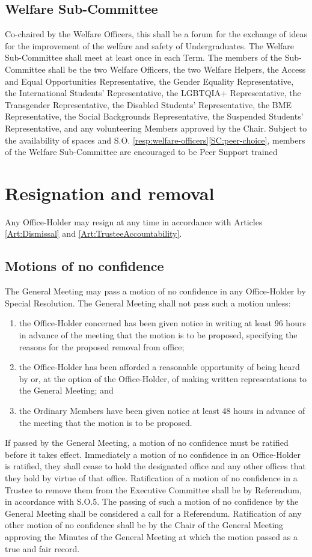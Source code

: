 \subsection{Welfare Sub-Committee} \label{ssec:welfare-committee}
\npara Co-chaired by the Welfare Officers, this shall be a forum for the exchange of ideas for the improvement of the welfare and safety of Undergraduates.
\npara The Welfare Sub-Committee shall meet at least once in each Term.
\npara The members of the Sub-Committee shall be the two Welfare Officers, the two Welfare Helpers, the Access and Equal Opportunities Representative, the Gender Equality Representative, the International Students’ Representative, the LGBTQIA+ Representative, the Transgender Representative, the Disabled Students’ Representative, the BME Representative, the Social Backgrounds Representative, the Suspended Students' Representative, and any volunteering Members approved by the Chair.
\npara Subject to the availability of spaces and S.O. \ref{resp:welfare-officers}\ref{SC:peer-choice}, members of the Welfare Sub-Committee are encouraged to be Peer Support trained
\section{Resignation and removal}
\npara Any Office-Holder may resign at any time in accordance with Articles \ref{Art:Dismissal} and \ref{Art:TrusteeAccountability}.
\subsection{Motions of no confidence}
\npara The General Meeting may pass a motion of no confidence in any Office-Holder by Special Resolution.  The General Meeting shall not pass such a motion unless:
\begin{enumerate}
	\item the Office-Holder concerned has been given notice in writing at least 96 hours in advance of the meeting that the motion is to be proposed, specifying the reasons for the proposed removal from office;
	\item the Office-Holder has been afforded a reasonable opportunity of being heard by or, at the option of the Office-Holder, of making written representations to the General Meeting; and
	\item the Ordinary Members have been given notice at least 48 hours in advance of the meeting that the motion is to be proposed.
\end{enumerate}
\npara If passed by the General Meeting, a motion of no confidence must be ratified before it takes effect.  Immediately a motion of no confidence in an Office-Holder is ratified, they shall cease to hold the designated office and any other offices that they hold by virtue of that office.
\npara Ratification of a motion of no confidence in a Trustee to remove them from the Executive Committee shall be by Referendum, in accordance with S.O.5.  The passing of such a motion of no confidence by the General Meeting shall be considered a call for a Referendum.
\npara Ratification of any other motion of no confidence shall be by the Chair of the General Meeting approving the Minutes of the General Meeting at which the motion passed as a true and fair record.
